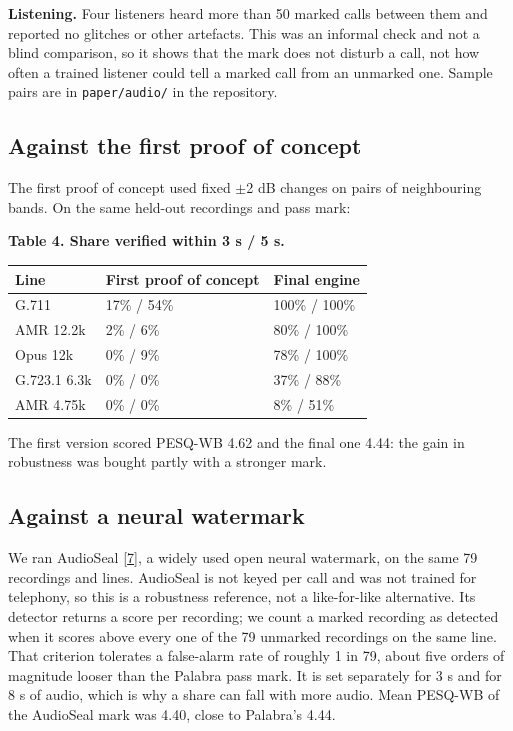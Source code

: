 \documentclass[10pt,a4paper]{article}
\begin{document}
\textbf{Listening.} Four listeners heard more than 50 marked calls between them and reported no glitches or other artefacts. This was an informal check and not a blind comparison, so it shows that the mark does not disturb a call, not how often a trained listener could tell a marked call from an unmarked one. Sample pairs are in \texttt{paper/audio/} in the repository.

\subsection{Against the first proof of concept}\label{s-6-4}

The first proof of concept used fixed $\pm$2 dB changes on pairs of neighbouring bands. On the same held-out recordings and pass mark:

\begin{center}\small {}\label{t-4}\textbf{Table 4. Share verified within 3 s / 5 s.}\end{center}

{\def\LTcaptype{none} %
\begin{longtable}[]{@{}lll@{}}
\toprule\noalign{}
Line & First proof of concept & Final engine \\
\midrule\noalign{}
\endhead
\bottomrule\noalign{}
\endlastfoot
G.711 & 17\% / 54\% & 100\% / 100\% \\
AMR 12.2k & 2\% / 6\% & 80\% / 100\% \\
Opus 12k & 0\% / 9\% & 78\% / 100\% \\
G.723.1 6.3k & 0\% / 0\% & 37\% / 88\% \\
AMR 4.75k & 0\% / 0\% & 8\% / 51\% \\
\end{longtable}
}

The first version scored PESQ-WB 4.62 and the final one 4.44: the gain in robustness was bought partly with a stronger mark.

\subsection{Against a neural watermark}\label{s-6-5}

We ran AudioSeal {[}\hyperlink{ref-7}{7}{]}, a widely used open neural watermark, on the same 79 recordings and lines. AudioSeal is not keyed per call and was not trained for telephony, so this is a robustness reference, not a like-for-like alternative. Its detector returns a score per recording; we count a marked recording as detected when it scores above every one of the 79 unmarked recordings on the same line. That criterion tolerates a false-alarm rate of roughly 1 in 79, about five orders of magnitude looser than the Palabra pass mark. It is set separately for 3 s and for 8 s of audio, which is why a share can fall with more audio. Mean PESQ-WB of the AudioSeal mark was 4.40, close to Palabra's 4.44.
\end{document}
